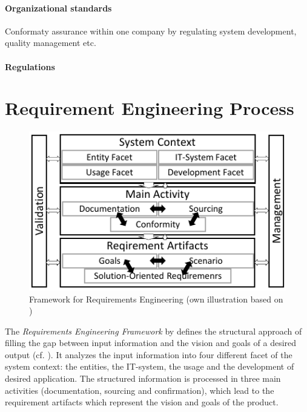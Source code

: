 \paragraph*{Organizational standards} Conformaty assurance within one company by regulating system development, quality management etc. \parencite[28]{Kotonya.2000}
\paragraph*{Regulations}
\section{Requirement Engineering Process} 
\begin{figure}[H]
    \centering
    \includegraphics[scale=1.5]{img/ReqAnFrameWork.pdf}
    \caption[Framework for Requirements Engineering]{Framework for Requirements Engineering (own illustration based on \protect\cite[41]{Pohl.2007})}
    \label{fig:reqFramework}
\end{figure}
The \textit{Requirements Engineering Framework} by \textcite{Pohl.2007} defines the structural approach of filling the gap between input information and the vision and goals of a desired output (cf. ). It analyzes the input information into four different facet of the system context: the entities, the IT-system, the usage and the development of desired application. The structured information is processed in three main activities (documentation, sourcing and confirmation), which lead to the requirement artifacts which represent the vision and goals of the product. \parencite[][38-39]{Pohl.2007}

